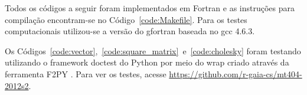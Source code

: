 \documentclass[12pt,a4paper]{article}
\begin{document}
Todos os c\'{o}digos a seguir foram implementados em Fortran e as instruções
para compilação encontram-se no Código~\ref{code:Makefile}. Para os testes
computacionais utilizou-se a versão do gfortran baseada no gcc 4.6.3.

Os Códigos~\ref{code:vector},~\ref{code:square_matrix}~e~\ref{code:cholesky}
foram testando utilizando o framework doctest do Python por meio do wrap criado
através da ferramenta F2PY \cite{Scipy}. Para ver os testes, acesse
\url{https://github.com/r-gaia-cs/mt404-2012s2}.








\end{document}
